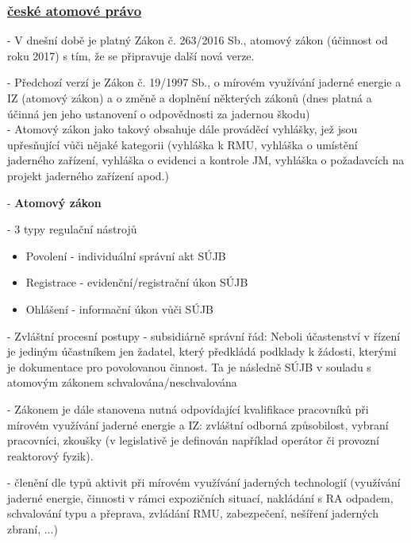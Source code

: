 \subsubsection{\underline{české atomové právo}}
- V dnešní době je platný Zákon č. 263/2016 Sb., atomový zákon (účinnost od roku 2017) s tím, že se připravuje další nová verze.

- Předchozí verzí je Zákon č. 19/1997 Sb., o mírovém využívání jaderné energie a IZ (atomový zákon) a o změně a doplnění některých zákonů (dnes platná a účinná jen jeho ustanovení o odpovědnosti za jadernou škodu)
\\

- Atomový zákon jako takový obsahuje dále prováděcí vyhlášky, jež jsou upřesňující vůči nějaké kategorii (vyhláška k RMU, vyhláška o umístění jaderného zařízení, vyhláška o evidenci a kontrole JM, vyhláška o požadavcích na projekt jaderného zařízení apod.)

\noindent- \textbf{Atomový zákon}

\noindent - 	3 typy regulační nástrojů
\begin{itemize}
	\item Povolení - individuální správní akt SÚJB
	\item Registrace - evidenční/registrační úkon SÚJB
	\item 	Ohlášení - informační úkon vůči SÚJB
\end{itemize}

- Zvláštní procesní postupy - subsidiárně správní řád: Neboli účastenství v řízení je jediným účastníkem jen žadatel, který předkládá podklady k žádosti, kterými je dokumentace pro povolovanou činnost. Ta je následně SÚJB v souladu s atomovým zákonem schvalována/neschvalována

- Zákonem je dále stanovena nutná odpovídající kvalifikace pracovníků při mírovém využívání jaderné energie a IZ: zvláštní odborná způsobilost, vybraní pracovníci, zkoušky (v legislativě je definován například operátor či provozní reaktorový fyzik).


-	členění dle typů aktivit při mírovém využívání jaderných technologií (využívání jaderné energie, činnosti v rámci expozičních situací, nakládání s RA odpadem, schvalování typu a přeprava, zvládání RMU, zabezpečení, nešíření jaderných zbraní, ...)

\vspace{5pt}



